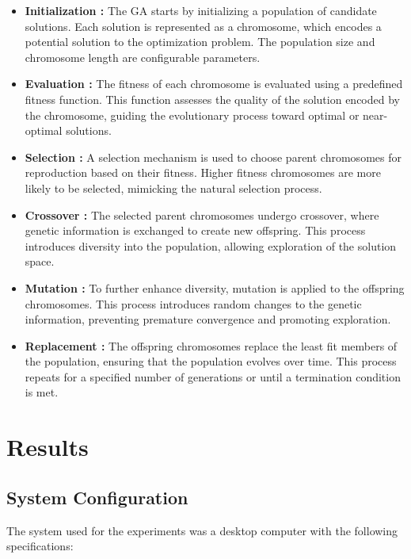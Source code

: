 \documentclass[conference]{IEEEtran}
\begin{document}
\begin{itemize}
\item \textbf{Initialization
    :} The GA starts by initializing a population of candidate solutions.
Each solution is represented as a chromosome, which encodes a potential
solution to the optimization problem. The population size and chromosome
length are configurable parameters.

\item \textbf{Evaluation
    :} The fitness of each chromosome is evaluated using a predefined
fitness function. This function assesses the quality of the solution encoded
by the chromosome, guiding the evolutionary process toward optimal or
near-optimal solutions.

\item \textbf{Selection
    :} A selection mechanism is used to choose parent chromosomes for
reproduction based on their fitness. Higher fitness chromosomes are more
likely to be selected, mimicking the natural selection process.

\item \textbf{Crossover
    :} The selected parent chromosomes undergo crossover, where genetic
information is exchanged to create new offspring. This process introduces
diversity into the population, allowing exploration of the solution space.

\item \textbf{Mutation
    :} To further enhance diversity, mutation is applied to the offspring
chromosomes. This process introduces random changes to the genetic
information, preventing premature convergence and promoting exploration.

\item \textbf{Replacement
    :} The offspring chromosomes replace the least fit members of the
population, ensuring that the population evolves over time. This process
repeats for a specified number of generations or until a termination
condition is met.
\end{itemize}

\section{Results}
\subsection{System Configuration}
The system used for the experiments was a desktop computer with the following
specifications:
\end{document}
